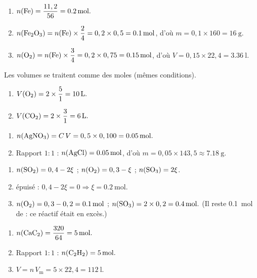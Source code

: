 \documentclass[11pt,a4paper]{article}
\begin{document}
\begin{corrige}
\begin{enumerate}[label=\alph*)]
  \item $n(\ce{Fe})=\dfrac{11,2}{56}=\qty{0.2}{\mole}.$
  \item $n(\ce{Fe2O3})=n(\ce{Fe})\times\dfrac{2}{4}=0,2\times0,5=\qty{0.1}{\mole}$, d'où
        $m=0,1\times160=\qty{16}{\gram}.$
  \item $n(\ce{O2})=n(\ce{Fe})\times\dfrac{3}{4}=0,2\times0,75=\qty{0.15}{\mole}$, d'où
        $V=0,15\times22,4=\qty{3.36}{\litre}.$
\end{enumerate}
\end{corrige}

\begin{corrige}
Les volumes se traitent comme des moles (mêmes conditions).
\begin{enumerate}[label=\alph*)]
  \item $V(\ce{O2})=2\times\dfrac{5}{1}=\qty{10}{\litre}.$
  \item $V(\ce{CO2})=2\times\dfrac{3}{1}=\qty{6}{\litre}.$
\end{enumerate}
\end{corrige}

\begin{corrige}
\begin{enumerate}[label=\alph*)]
  \item $n(\ce{AgNO3})=C\,V=0,5\times0,100=\qty{0.05}{\mole}.$
  \item Rapport $1:1$ : $n(\ce{AgCl})=\qty{0.05}{\mole}$, d'où
        $m=0,05\times143,5\approx\qty{7.18}{\gram}.$
\end{enumerate}
\end{corrige}

\begin{corrige}
\begin{enumerate}[label=\alph*)]
  \item $n(\ce{SO2})=0,4-2\xi$ ; \; $n(\ce{O2})=0,3-\xi$ ; \; $n(\ce{SO3})=2\xi$.
  \item {} épuisé : $0,4-2\xi=0\Rightarrow \xi=\qty{0.2}{\mole}.$
  \item $n(\ce{O2})=0,3-0,2=\qty{0.1}{\mole}$ ; \; $n(\ce{SO3})=2\times0,2=\qty{0.4}{\mole}.$
        (Il reste \qty{0.1}{\mole} de  : ce réactif était en excès.)
\end{enumerate}
\end{corrige}

\begin{corrige}
\begin{enumerate}[label=\alph*)]
  \item $n(\ce{CaC2})=\dfrac{320}{64}=\qty{5}{\mole}.$
  \item Rapport $1:1$ : $n(\ce{C2H2})=\qty{5}{\mole}.$
  \item $V=n\,V_{\mathrm{m}}=5\times22,4=\qty{112}{\litre}.$
\end{enumerate}
\end{corrige}
\end{document}
